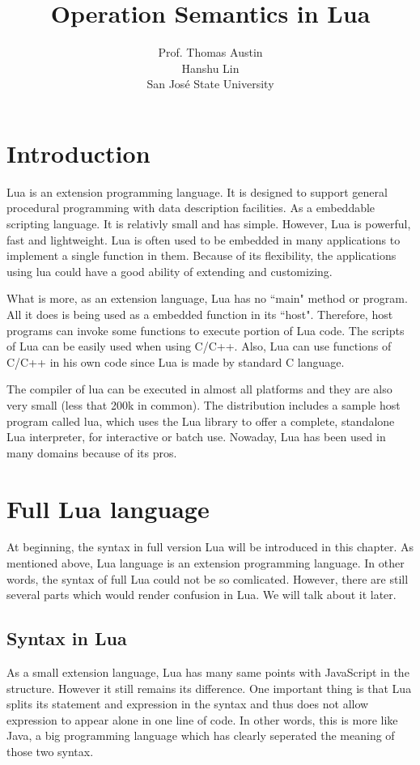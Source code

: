 \documentclass{article}
\title{ Operation Semantics in Lua}
\author{
  Prof. Thomas Austin\\
  Hanshu Lin \\
  San Jos\'{e} State University \\
  }
\date{}
\begin{document}
\maketitle

\section{Introduction}

Lua is an extension programming language. It is designed to support general procedural programming with data description facilities. As a embeddable scripting language. It is relativly small and has simple. However, Lua is powerful, fast and lightweight. Lua is often used to be embedded in many applications to implement a single function in them. Because of its flexibility, the applications using lua could have a good ability of extending and customizing.

What is more, as an extension language, Lua has no ``main" method or program. All it does is being used as a embedded function in its ``host". Therefore, host programs can invoke some functions to execute portion of Lua code. The scripts of Lua can be easily used when using C/C++. Also, Lua can use functions of C/C++ in his own code since Lua is made by standard C language.

The compiler of lua can be executed in almost all platforms and they are also very small (less that 200k in common). The distribution includes a sample host program called lua, which uses the Lua library to offer a complete, standalone Lua interpreter, for interactive or batch use. Nowaday, Lua has been used in many domains because of its pros.

\section{Full Lua language}
At beginning, the syntax in full version Lua will be introduced in this chapter. As mentioned above, Lua language is an extension programming language. In other words, the syntax of full Lua could not be so comlicated. However, there are still several parts which would render confusion in Lua. We will talk about it later.  

\subsection{Syntax in Lua}
As a small extension language, Lua has many same points with JavaScript in the structure. However it still remains its difference. One important thing is that Lua splits its statement and expression in the syntax and thus does not allow expression to appear alone in one line of code. In other words, this is more like Java, a big programming language which has clearly seperated the meaning of those two syntax.
\end{document}
